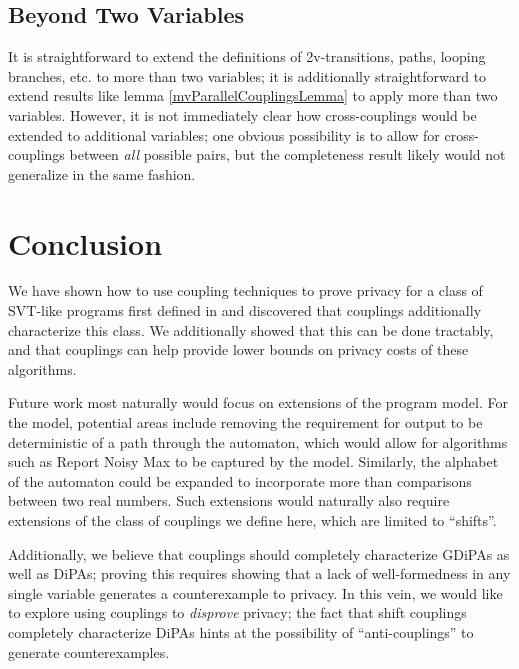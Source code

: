 \subsection{Beyond Two Variables}

It is straightforward to extend the definitions of 2v-transitions, paths, looping branches, etc. to more than two variables; it is additionally straightforward to extend results like lemma \ref{mvParallelCouplingsLemma} to apply more than two variables. However, it is not immediately clear how cross-couplings would be extended to additional variables;
one obvious possibility is to allow for cross-couplings between \textit{all} possible pairs, but the completeness result likely would not generalize in the same fashion. 

\section{Conclusion}
We have shown how to use coupling techniques to prove privacy for a class of SVT-like programs first defined in \cite{chadhaLinearTimeDecidability2021} and discovered that couplings additionally characterize this class. We additionally showed that this can be done tractably, and that couplings can help provide lower bounds on privacy costs of these algorithms. 

Future work most naturally would focus on extensions of the program model. For the model, potential areas include removing the requirement for output to be deterministic of a path through the automaton, which would allow for algorithms such as Report Noisy Max to be captured by the model. Similarly, the alphabet of the automaton could be expanded to incorporate more than comparisons between two real numbers. 
Such extensions would naturally also require extensions of the class of couplings we define here, which are limited to ``shifts''. 

Additionally, we believe that couplings should completely characterize GDiPAs as well as DiPAs; proving this requires showing that a lack of well-formedness in any single variable generates a counterexample to privacy. 
In this vein, we would like to explore using couplings to \textit{disprove} privacy; the fact that shift couplings completely characterize DiPAs hints at the possibility of ``anti-couplings'' to generate counterexamples.